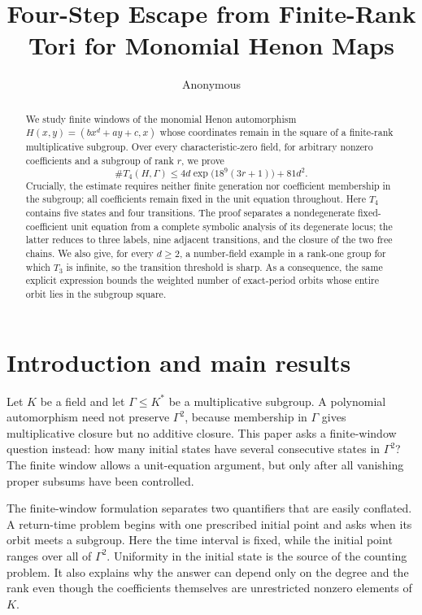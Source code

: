 \documentclass[11pt]{article}
\title{Four-Step Escape from Finite-Rank Tori for Monomial Henon Maps}
\author{Anonymous}
\date{}
\theoremstyle{definition}
\theoremstyle{remark}
\begin{document}
\maketitle

\begin{abstract}
We study finite windows of the monomial Henon automorphism
\(H(x,y)=(b x^d+a y+c,x)\) whose coordinates remain in the square of a
finite-rank multiplicative subgroup.  Over every characteristic-zero field,
for arbitrary nonzero coefficients and a subgroup of rank \(r\), we prove
\[
 \#T_4(H,\Gamma)
 \le 4d\exp\!\bigl(18^9(3r+1)\bigr)+81d^2.
\]
Crucially, the estimate requires neither finite generation nor coefficient
membership in the subgroup; all coefficients remain fixed in the unit
equation throughout.  Here \(T_4\) contains five states and four transitions.  The proof
separates
a nondegenerate fixed-coefficient unit equation from a complete symbolic
analysis of its degenerate locus; the latter reduces to three labels, nine
adjacent transitions, and the closure of the two free chains.  We also give,
for every \(d\ge2\), a number-field example in a rank-one group for which
\(T_3\) is infinite, so the transition threshold is sharp.  As a consequence,
the same explicit expression bounds the weighted number of exact-period
orbits whose entire orbit lies in the subgroup square.
\end{abstract}

\section{Introduction and main results}\label{sec:introduction}

Let \(K\) be a field and let \(\Gamma\le K^\ast\) be a multiplicative
subgroup.  A polynomial automorphism need not preserve \(\Gamma^2\), because
membership in \(\Gamma\) gives multiplicative closure but no additive
closure.  This paper asks a finite-window question instead: how many initial
states have several consecutive states in \(\Gamma^2\)?  The finite window
allows a unit-equation argument, but only after all vanishing proper subsums
have been controlled.

The finite-window formulation separates two quantifiers that are easily
conflated.  A return-time problem begins with one prescribed initial point
and asks when its orbit meets a subgroup.  Here the time interval is fixed,
while the initial point ranges over all of \(\Gamma^2\).  Uniformity in the
initial state is the source of the counting problem.  It also explains why
the answer can depend only on the degree and the rank even though the
coefficients themselves are unrestricted nonzero elements of \(K\).
\end{document}
